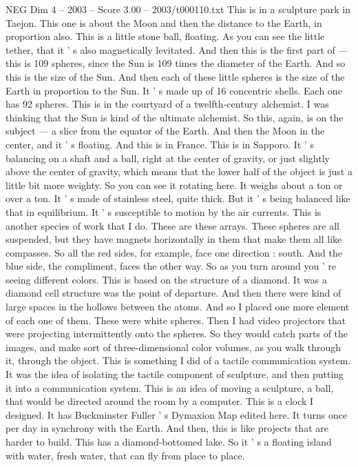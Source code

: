 \begin{textsample}{NEG Dim 4 – 2003 – Score 3.00 – 2003/t000110.txt}
This is in a sculpture park in Taejon.
This one is about the Moon and then the distance to the Earth, in proportion also.
This is a little stone ball, floating.
As you can see the little tether, that it ' s also magnetically levitated.
And then this is the first part of — this is 109 spheres, since the Sun is 109 times the diameter of the Earth.
And so this is the size of the Sun.
And then each of these little spheres is the size of the Earth in proportion to the Sun.
It ' s made up of 16 concentric shells.
Each one has 92 spheres.
This is in the courtyard of a twelfth-century alchemist.
I was thinking that the Sun is kind of the ultimate alchemist.
So this, again, is on the subject — a slice from the equator of the Earth.
And then the Moon in the center, and it ' s floating.
And this is in France.
This is in Sapporo.
It ' s balancing on a shaft and a ball, right at the center of gravity, or just slightly above the center of gravity, which means that the lower half of the object is just a little bit more weighty.
So you can see it rotating here.
It weighs about a ton or over a ton.
It ' s made of stainless steel, quite thick.
But it ' s being balanced like that in equilibrium.
It ' s susceptible to motion by the air currents.
This is another species of work that I do.
These are these arrays.
These spheres are all suspended, but they have magnets horizontally in them that make them all like compasses.
So all the red sides, for example, face one direction : south.
And the blue side, the compliment, faces the other way.
So as you turn around you ' re seeing different colors.
This is based on the structure of a diamond.
It was a diamond cell structure was the point of departure.
And then there were kind of large spaces in the hollows between the atoms.
And so I placed one more element of each one of them.
These were white spheres.
Then I had video projectors that were projecting intermittently onto the spheres.
So they would catch parts of the images, and make sort of three-dimensional color volumes, as you walk through it, through the object.
This is something I did of a tactile communication system.
It was the idea of isolating the tactile component of sculpture, and then putting it into a communication system.
This is an idea of moving a sculpture, a ball, that would be directed around the room by a computer.
This is a clock I designed.
It has Buckminster Fuller ' s Dymaxion Map edited here.
It turns once per day in synchrony with the Earth.
And then, this is like projects that are harder to build.
This has a diamond-bottomed lake.
So it ' s a floating island with water, fresh water, that can fly from place to place.

\end{textsample}

